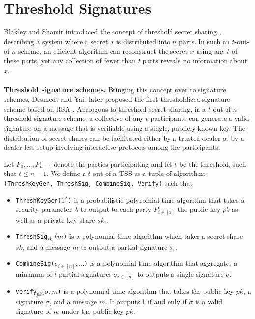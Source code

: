 \section{Threshold Signatures}
\label{prelim:thresholdSignatures}
Blakley and Shamir introduced the concept of threshold secret sharing \cite{blakley1979safeguarding}\cite{shamir1979share}, describing a system where a secret \(x\) is distributed into \(n\) parts. In such an \(t\)-out-of-\(n\) scheme, an efficient algorithm can reconstruct the secret \(x\) using any \(t\) of these parts, yet any collection of fewer than \(t\) parts reveals no information about \(x\).
\\\\
\textbf{Threshold signature schemes.} Bringing this concept over to signature schemes, Desmedt and Yair later proposed the first thresholdized signature scheme based on RSA \cite{desmedt1991shared}. Analogous to threshold secret sharing, in a $t$-out-of-$n$ threshold signature scheme, a collective of any $t$ participants can generate a valid signature on a message that is verifiable using a single, publicly known key. The distribution of secret shares can be facilitated either by a trusted dealer or by a dealer-less setup involving interactive protocols among the participants.

\begin{definition}
    \label{def:tss}
    Let $P_0,...,P_{n-1}$ denote the parties participating and let $t$ be the threshold, such that $t \leq n-1$. We define a $t$-out-of-$n$ TSS as a tuple of algorithms \texttt{\textup{(ThreshKeyGen, ThreshSig, CombineSig, Verify)}} such that
    \begin{itemize}
        \item \texttt{\textup{ThreshKeyGen($1^\lambda$)}} is a probabilistic polynomial-time algorithm that takes a security parameter $\lambda$ to output to each party $P_{i\in [n]}$ the public key $pk$ as well as a private key share $sk_i$.
        \item \texttt{\textup{ThreshSig$_{sk_i}$($m$)}} is a polynomial-time algorithm which takes a secret share $sk_i$ and a message $m$ to output a partial signature $\sigma_i$.
        \item \texttt{\textup{CombineSig($\sigma_{i \in [n]},...$)}} is a polynomial-time algorithm that aggregates a minimum of $t$ partial signatures $\sigma_{i \in [n]}$ to outputs a single signature $\sigma$.
        \item \texttt{\textup{Verify$_{pk}(\sigma, m$)}} is a polynomial-time algorithm that takes the public key $pk$, a signature $\sigma$, and a message $m$. It outputs 1 if and only if $\sigma$ is a valid signature of $m$ under the public key $pk$.
    \end{itemize}
\end{definition}

